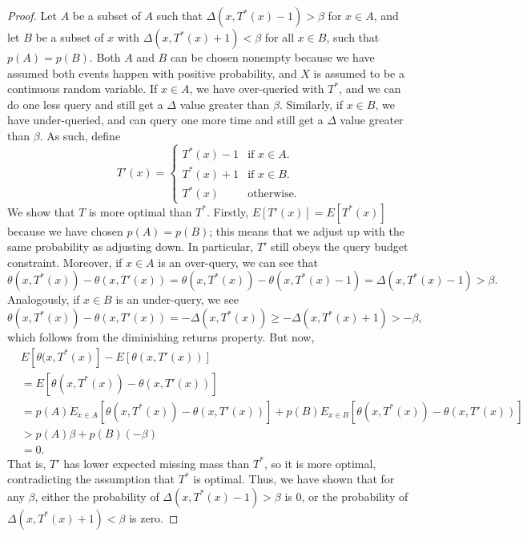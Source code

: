 \documentclass{scrartcl}
\begin{document}
\begin{proof}
Let $A$ be a subset of $A$ such that $\Delta(x, T^*(x) - 1) > \beta$ for $x \in A$, 
and let $B$ be a subset of $x$ with $\Delta(x, T^*(x) + 1) < \beta$ for all $x \in B$, such that $p(A) = p(B)$.
 Both $A$ and $B$ can be chosen nonempty because we have assumed both events happen with positive probability, 
 and $X$ is assumed to be a continuous random variable. If $x \in A$, we have over-queried with $T^*$, and we can do one less query and still get a $\Delta$ value greater than $\beta$. 
 Similarly, if $x \in B$, we have under-queried, and can query one more time and still get a $\Delta$ value greater than $\beta$. As such, define
\[ T'(x) = \begin{cases*}
        T^*(x) - 1 & \text{if $x \in A$.} \\
        T^*(x) + 1 & \text{if $x \in B$.} \\
        T^*(x) & \text{otherwise.}
    \end{cases*} 
\]
We show that $T$ is more optimal than $T^*$. Firstly, $E[T'(x)] = E[T^*(x)]$ 
because we have chosen $p(A) = p(B)$; this means that we adjust up with the same probability as adjusting down. 
In particular, $T'$ still obeys the query budget constraint.  Moreover, if $x \in A$ is an over-query, we can see that
\[ \theta(x, T^*(x)) - \theta(x, T'(x)) = \theta(x, T^*(x)) - \theta(x, T^*(x) - 1) = \Delta(x, T^*(x) - 1) > \beta . \]
Analogously, if $x \in B$ is an under-query, we see
\[ \theta(x, T^*(x)) - \theta(x, T'(x)) = -\Delta(x, T^*(x)) \ge -\Delta(x, T^*(x) + 1) > -\beta , \]
which follows from the diminishing returns property. But now, 
\begin{align*}
&E[\theta(x, T^*(x)] - E[\theta(x, T'(x))] \\
&= E[\theta(x, T^*(x)) - \theta(x, T'(x))] \\
&= p(A)E_{x \in A}[\theta(x, T^*(x)) - \theta(x, T'(x))] + p(B)E_{x \in B}[\theta(x, T^*(x)) - \theta(x, T'(x))] \\
&> p(A)\beta + p(B)(-\beta) \\
&= 0 .
\end{align*}
That is, $T'$ has lower expected missing mass than $T^*$, so it is more optimal, contradicting the assumption that $T^*$ is optimal. 
Thus, we have shown that for any $\beta$, either the probability of $\Delta(x, T^*(x) - 1) > \beta$ is $0$, or the probability of $\Delta(x, T^*(x) + 1) < \beta$ is zero.
\end{proof}

\printbibliography
\end{document}
